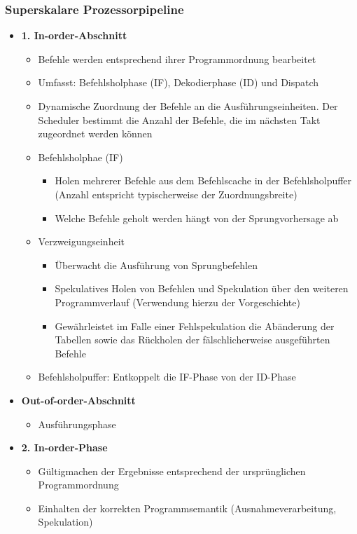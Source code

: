 \subsubsection{Superskalare Prozessorpipeline}
\begin{itemize}
	\item \textbf{1. In-order-Abschnitt}
	\begin{itemize}
		\item Befehle werden entsprechend ihrer Programmordnung bearbeitet
		\item Umfasst: Befehlsholphase (IF), Dekodierphase (ID) und Dispatch
		\item Dynamische Zuordnung der Befehle an die Ausführungseinheiten. Der Scheduler bestimmt die Anzahl der Befehle, die im nächsten Takt zugeordnet werden können
		\item Befehlsholphae (IF)
		\begin{itemize}
			\item Holen mehrerer Befehle aus dem Befehlscache in der Befehlsholpuffer (Anzahl entspricht typischerweise der Zuordnungsbreite)
			\item Welche Befehle geholt werden hängt von der Sprungvorhersage ab
		\end{itemize}
		\item Verzweigungseinheit
		\begin{itemize}
			\item Überwacht die Ausführung von Sprungbefehlen
			\item Spekulatives Holen von Befehlen und Spekulation über den weiteren Programmverlauf (Verwendung hierzu der Vorgeschichte)
			\item Gewährleistet im Falle einer Fehlspekulation die Abänderung der Tabellen sowie das Rückholen der fälschlicherweise ausgeführten Befehle
		\end{itemize}
		\item Befehlsholpuffer: Entkoppelt die IF-Phase von der ID-Phase
	\end{itemize}
	\item \textbf{Out-of-order-Abschnitt}
	\begin{itemize}
		\item Ausführungsphase
	\end{itemize}
	\item \textbf{2. In-order-Phase}
	\begin{itemize}
		\item Gültigmachen der Ergebnisse entsprechend der ursprünglichen Programmordnung
		\item Einhalten der korrekten Programmsemantik (Ausnahmeverarbeitung, Spekulation)
	\end{itemize}
\end{itemize}

